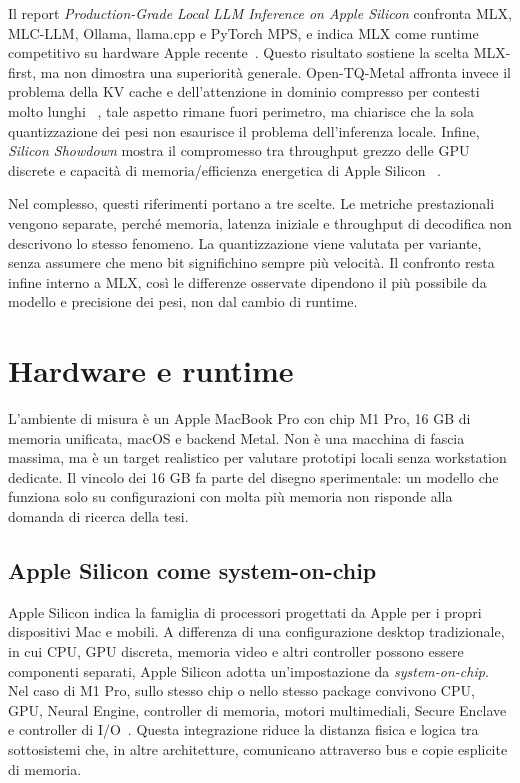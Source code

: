 Il report \emph{Production-Grade Local LLM Inference on Apple Silicon} confronta
MLX, MLC-LLM, Ollama, llama.cpp e PyTorch MPS, e indica MLX come runtime
competitivo su hardware Apple recente~\cite{rajesh2025productionlocal}. Questo
risultato sostiene la scelta MLX-first, ma non dimostra una superiorità
generale. Open-TQ-Metal affronta invece il problema della KV cache e
dell'attenzione in dominio compresso per contesti molto lunghi
~\cite{vegasena2026opentqmetal}, tale aspetto rimane fuori perimetro, ma chiarisce
che la sola quantizzazione dei pesi non esaurisce il problema dell'inferenza
locale. Infine, \emph{Silicon Showdown} mostra il compromesso tra throughput
grezzo delle GPU discrete e capacità di memoria/efficienza energetica di Apple
Silicon
~\cite{javat2026silicon}.

Nel complesso, questi riferimenti portano a tre scelte. Le metriche
prestazionali vengono separate, perché memoria, latenza iniziale e throughput di
decodifica non descrivono lo stesso fenomeno. La quantizzazione viene valutata
per variante, senza assumere che meno bit significhino sempre più velocità. Il
confronto resta infine interno a MLX, così le differenze osservate dipendono il
più possibile da modello e precisione dei pesi, non dal cambio di runtime.

\section{Hardware e runtime}
\label{sec:experimental_hardware_runtime}

L'ambiente di misura è un Apple MacBook Pro con chip M1 Pro, 16 GB di memoria
unificata, macOS e backend Metal. Non è una macchina di fascia massima, ma è
un target realistico per valutare prototipi locali senza workstation dedicate.
Il vincolo dei 16 GB fa parte del disegno sperimentale: un modello che funziona
solo su configurazioni con molta più memoria non risponde alla domanda di
ricerca della tesi.

\subsection{Apple Silicon come system-on-chip}
\label{subsec:apple_silicon_soc}

Apple Silicon indica la famiglia di processori progettati da Apple per i propri
dispositivi Mac e mobili. A differenza di una configurazione desktop
tradizionale, in cui CPU, GPU discreta, memoria video e altri controller possono
essere componenti separati, Apple Silicon adotta un'impostazione da
\emph{system-on-chip}. Nel caso di M1 Pro, sullo stesso chip o nello stesso
package convivono CPU, GPU, Neural Engine, controller di memoria, motori
multimediali, Secure Enclave e controller di I/O~\cite{apple2021m1pro}. Questa
integrazione riduce la distanza fisica e logica tra sottosistemi che, in altre
architetture, comunicano attraverso bus e copie esplicite di memoria.

